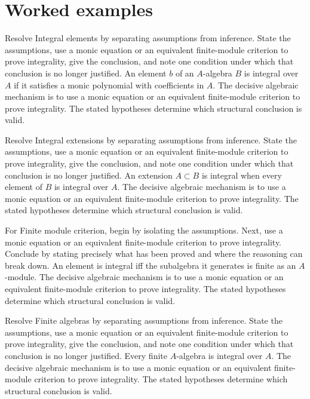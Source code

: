\section{Worked examples}

\begin{example}\label{ex:v19-worked-01}
Resolve Integral elements by separating assumptions from inference. State the assumptions, use a monic equation or an equivalent finite-module criterion to prove integrality, give the conclusion, and note one condition under which that conclusion is no longer justified. An element $b$ of an $A$-algebra $B$ is integral over $A$ if it satisfies a monic polynomial with coefficients in $A$. The decisive algebraic mechanism is to use a monic equation or an equivalent finite-module criterion to prove integrality. The stated hypotheses determine which structural conclusion is valid.
\end{example}

\begin{example}\label{ex:v19-worked-02}
Resolve Integral extensions by separating assumptions from inference. State the assumptions, use a monic equation or an equivalent finite-module criterion to prove integrality, give the conclusion, and note one condition under which that conclusion is no longer justified. An extension $A\subset B$ is integral when every element of $B$ is integral over $A$. The decisive algebraic mechanism is to use a monic equation or an equivalent finite-module criterion to prove integrality. The stated hypotheses determine which structural conclusion is valid.
\end{example}

\begin{example}\label{ex:v19-worked-03}
For Finite module criterion, begin by isolating the assumptions. Next, use a monic equation or an equivalent finite-module criterion to prove integrality. Conclude by stating precisely what has been proved and where the reasoning can break down. An element is integral iff the subalgebra it generates is finite as an $A$-module. The decisive algebraic mechanism is to use a monic equation or an equivalent finite-module criterion to prove integrality. The stated hypotheses determine which structural conclusion is valid.
\end{example}

\begin{example}\label{ex:v19-worked-04}
Resolve Finite algebras by separating assumptions from inference. State the assumptions, use a monic equation or an equivalent finite-module criterion to prove integrality, give the conclusion, and note one condition under which that conclusion is no longer justified. Every finite $A$-algebra is integral over $A$. The decisive algebraic mechanism is to use a monic equation or an equivalent finite-module criterion to prove integrality. The stated hypotheses determine which structural conclusion is valid.
\end{example}

